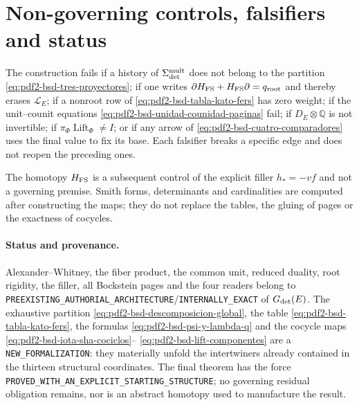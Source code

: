\section{Non-governing controls, falsifiers and status}

\begin{falsifier}
The construction fails if a history of
$\Sigma_{\rm det}^{\rm mult}$ does not belong to the partition
\eqref{eq:pdf2-bsd-tres-proyectores}; if one writes
$\partial H_{\rm FS}+H_{\rm FS}\partial=q_{\rm root}$ and thereby erases
$\mathcal L_E$; if a nonroot row of
\eqref{eq:pdf2-bsd-tabla-kato-fers} has zero weight; if the unit--counit equations
\eqref{eq:pdf2-bsd-unidad-counidad-paginas} fail; if
$D_E\otimes\mathbb Q$ is not invertible; if
$\pi_\Phi\operatorname{Lift}_\Phi\ne I$; or if any arrow of
\eqref{eq:pdf2-bsd-cuatro-comparadores} uses the final value to fix its
base. Each falsifier breaks a specific edge and does not reopen the preceding ones.
\end{falsifier}

The homotopy $H_{\rm FS}$ is a subsequent control of the explicit filler
$h_*=-vf$ and not a governing premise. Smith forms,
determinants and cardinalities are computed after constructing the maps;
they do not replace the tables, the gluing of pages or the exactness of cocycles.

\paragraph{Status and provenance.}
Alexander--Whitney, the fiber product, the common unit, reduced
duality, root rigidity, the filler, all Bockstein pages and
the four readers belong to
\texttt{PREEXISTING\_AUTHORIAL\_ARCHITECTURE}/\texttt{INTERNALLY\_EXACT} of
$\mathfrak G_{\rm det}(E)$. The exhaustive partition
\eqref{eq:pdf2-bsd-descomposicion-global}, the table
\eqref{eq:pdf2-bsd-tabla-kato-fers}, the formulas
\eqref{eq:pdf2-bsd-psi-y-lambda-q} and the cocycle maps
\eqref{eq:pdf2-bsd-iota-sha-cociclos}--
\eqref{eq:pdf2-bsd-lift-componentes} are a
\texttt{NEW\_FORMALIZATION}: they materially unfold the intertwiners
already contained in the thirteen structural coordinates. The final theorem has the
force
\texttt{PROVED\_WITH\_AN\_EXPLICIT\_STARTING\_STRUCTURE}; no
governing residual obligation remains, nor is an abstract homotopy used to
manufacture the result.
